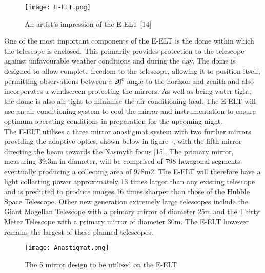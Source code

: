 \documentclass[pdf,color]{UoBnote}
\begin{document}
\begin{figure}[H]
\begin{center}
\texttt{[image: E-ELT.png]}
\end{center}
\caption{An artist’s impression of the E-ELT [14]}\label{fig:figure1}
\end{figure}
\noindent
One of the most important components of the E-ELT is the dome within which the telescope is enclosed. This primarily provides protection to the telescope against unfavourable weather conditions and during the day. The dome is designed to allow complete freedom to the telescope, allowing it to position itself, permitting observations between a 20$^{0}$ angle to the horizon and zenith and also incorporates a windscreen protecting the mirrors. As well as being water-tight, the dome is also air-tight to minimise the air-conditioning load. The E-ELT will use an air-conditioning system to cool the mirror and instrumentation to ensure optimum operating conditions in preparation for the upcoming night.\\
\newline
The E-ELT utilises a three mirror anastigmat system with two further mirrors providing the adaptive optics, shown below in figure -, with the fifth mirror directing the beam towards the Nasmyth focus [15]. The primary mirror, measuring 39.3m in diameter, will be comprised of 798 hexagonal segments eventually producing a collecting area of 978m2. The E-ELT will therefore have a light collecting power approximately 13 times larger than any existing telescope and is predicted to produce images 16 times sharper than those of the Hubble Space Telescope. Other new generation extremely large telescopes include the Giant Magellan Telescope with a primary mirror of diameter 25m and the Thirty Meter Telescope with a primary mirror of diameter 30m. The E-ELT however remains the largest of these planned telescopes. 
\begin{figure}[H]
\begin{center}
\texttt{[image: Anastigmat.png]}
\end{center}
\caption{The 5 mirror design to be utilised on the E-ELT}\label{fig:figure1}
\end{figure}
\noindent
\end{document}
